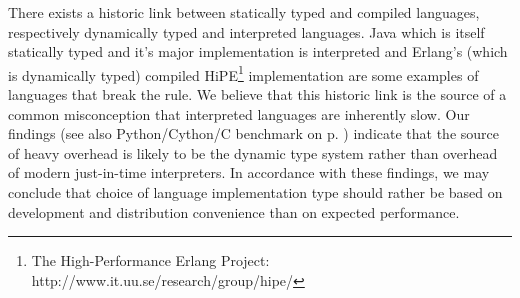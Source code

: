 There exists a historic link between statically typed and compiled languages, respectively
dynamically typed and interpreted languages. Java which is itself statically typed and it's major
implementation is interpreted and Erlang's (which is dynamically typed) compiled
HiPE\footnote{The High-Performance Erlang Project: http://www.it.uu.se/research/group/hipe/}
implementation are some examples of languages that break the rule. We believe that this historic
link is the source of a common misconception that interpreted languages are inherently slow. Our
findings (see also Python/Cython/C benchmark on p. \pageref{sec:CythonPerformace}) indicate that
the source of heavy overhead is likely to be the dynamic type system rather than overhead of modern
just-in-time interpreters. In accordance with these findings, we may conclude that choice of language
implementation type should rather be based on development and distribution convenience than on
expected performance. %


